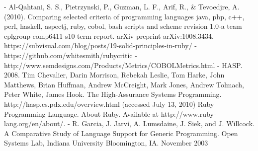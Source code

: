 \documentclass[twoside,twocolumn]{article}
\begin{document}
\begin{thebibliography}{99} %

 
\newblock - Al-Qahtani, S. S., Pietrzynski, P., Guzman, L. F., Arif, R., & Tevoedjre, A. (2010). Comparing selected criteria of programming languages java, php, c++, perl, haskell, aspectj, ruby, cobol, bash scripts and scheme revision 1.0-a team cplgroup comp6411-s10 term report. arXiv preprint arXiv:1008.3434.
\newblock https://subvisual.com/blog/posts/19-solid-principles-in-ruby/
\newblock - https://github.com/whitesmith/rubycritic
\newblock - http://www.semdesigns.com/Products/Metrics/COBOLMetrics.html
\newblock - HASP. 2008. Tim Chevalier, Darin Morrison, Rebekah Leslie, Tom Harke, John Matthews, Brian Huffman, Andrew McCreight, Mark Jones, Andrew Tolmach, Peter White, James Hook. The High-Assurance Systems Programming.  http://hasp.cs.pdx.edu/overview.html (accessed July 13, 2010)
\newblock Ruby Programming Language. About Ruby. Available at http://www.ruby-lang.org/en/about/. 
\newblock - R. Garcia, J. Jarvi, A. Lumsdaine, J. Siek, and J. Willcock. A Comparative Study of Language Support for Generic Programming. Open Systems Lab, Indiana University Bloomington, IA. November 2003
\newblock 
\end{thebibliography}

\end{document}
